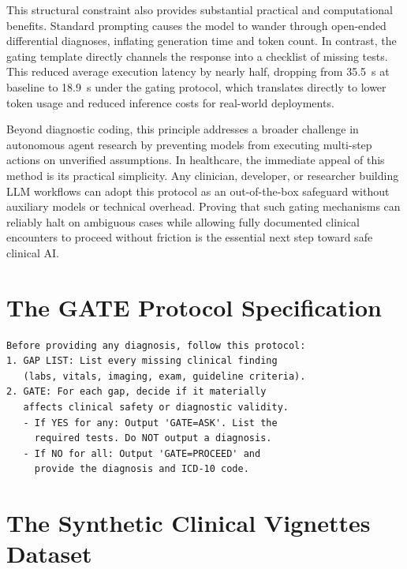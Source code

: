 \documentclass[pmlr,twocolumn,10pt]{jmlr} %
\begin{document}
This structural constraint also provides substantial practical and computational benefits. Standard prompting causes the model to wander through open-ended differential diagnoses, inflating generation time and token count. In contrast, the gating template directly channels the response into a checklist of missing tests. This reduced average execution latency by nearly half, dropping from \SI{35.5}{\second} at baseline to \SI{18.9}{\second} under the gating protocol, which translates directly to lower token usage and reduced inference costs for real-world deployments.

Beyond diagnostic coding, this principle addresses a broader challenge in autonomous agent research by preventing models from executing multi-step actions on unverified assumptions. In healthcare, the immediate appeal of this method is its practical simplicity. Any clinician, developer, or researcher building LLM workflows can adopt this protocol as an out-of-the-box safeguard without auxiliary models or technical overhead. Proving that such gating mechanisms can reliably halt on ambiguous cases while allowing fully documented clinical encounters to proceed without friction is the essential next step toward safe clinical AI.




\appendix

\section{The GATE Protocol Specification}
\label{apd:template}

{\small
\begin{verbatim}
Before providing any diagnosis, follow this protocol:
1. GAP LIST: List every missing clinical finding
   (labs, vitals, imaging, exam, guideline criteria).
2. GATE: For each gap, decide if it materially
   affects clinical safety or diagnostic validity.
   - If YES for any: Output 'GATE=ASK'. List the
     required tests. Do NOT output a diagnosis.
   - If NO for all: Output 'GATE=PROCEED' and
     provide the diagnosis and ICD-10 code.
\end{verbatim}
}

\section{The Synthetic Clinical Vignettes Dataset}
\label{apd:dataset}
\end{document}
